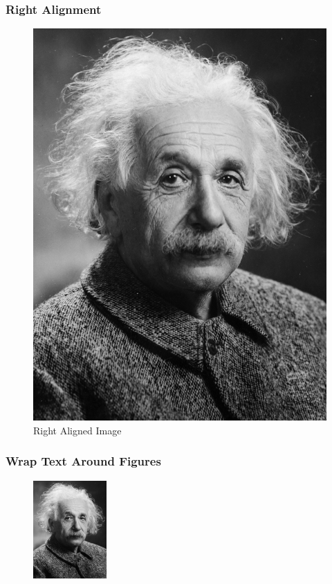 \documentclass{article}
\begin{document}
\subsubsection{Right Alignment}
\begin{figure}[htbp]
    \hfill
    \includegraphics[]{Images/Albert_Einstein.png}
    \caption{Right Aligned Image}
    \label{fig:enter-label}
\end{figure}
\pagebreak


\subsubsection{Wrap Text Around Figures}

\begin{figure}
    \centering
    \includegraphics[width=0.25\textwidth]{Images/Albert_Einstein.png}
\end{figure}
\end{document}

